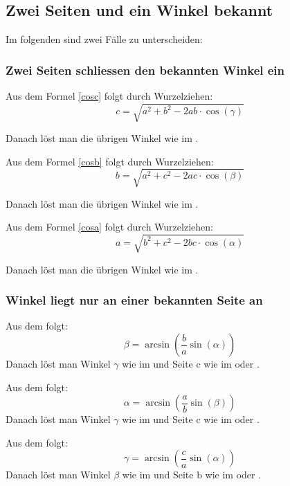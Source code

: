 \documentclass[ngerman,12pt]{scrartcl}
\begin{document}
\subsection{Zwei Seiten und ein Winkel bekannt}
Im folgenden sind zwei Fälle zu unterscheiden:
\subsubsection{Zwei Seiten schliessen den bekannten Winkel ein}
\begin{fall}[a,b,$\gamma$]
Aus dem  Formel \ref{cosc} folgt durch Wurzelziehen:
$$
c = \sqrt{a^2 + b^2 -2ab \cdot \cos(\gamma)}
$$

Danach löst man die übrigen Winkel wie im  .
\end{fall}

\begin{fall}[a,c,$\beta$]
Aus dem  Formel \ref{cosb} folgt durch Wurzelziehen:
$$
b = \sqrt{a^2 + c^2 -2ac \cdot \cos(\beta)}
$$

Danach löst man die übrigen Winkel wie im .
\end{fall}

\begin{fall}[b,c,$\alpha$]
Aus dem  Formel \ref{cosa} folgt durch Wurzelziehen:
$$
a = \sqrt{b^2 + c^2 -2bc \cdot \cos(\alpha)}
$$

Danach löst man die übrigen Winkel wie im .
\end{fall}

\subsubsection{Winkel liegt nur an einer bekannten Seite an}
\begin{fall}[a,b,$\alpha$]
Aus dem  folgt:
$$
\beta = \arcsin \left( \frac{b}{a} \sin(\alpha) \right)
$$
Danach löst man Winkel $\gamma$ wie im  und Seite c wie im  oder .
\end{fall}

\begin{fall}[a,b,$\beta$]
Aus dem  folgt:
$$
\alpha = \arcsin \left( \frac{a}{b} \sin(\beta) \right)
$$
Danach löst man Winkel $\gamma$ wie im  und Seite c wie im  oder .
\end{fall}

\begin{fall}[a,c,$\alpha$]
Aus dem  folgt:
$$
\gamma = \arcsin \left( \frac{c}{a} \sin(\alpha) \right)
$$
Danach löst man Winkel $\beta$ wie im  und Seite b wie im  oder .
\end{fall}
\end{document}
